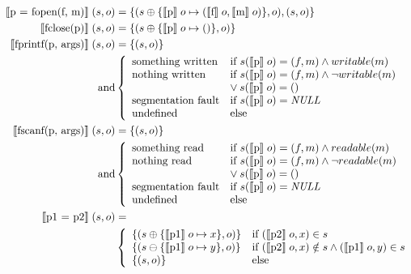 \begin{align*}
\llbracket \text{p = fopen(f, m)} \rrbracket \; (s,o) &= \{ (s \oplus \{ \llbracket \text{p} \rrbracket \; o \mapsto (\llbracket \text{f} \rrbracket \; o, \llbracket \text{m} \rrbracket \; o) \}, o), (s,o) \}\\
\llbracket \text{fclose(p)} \rrbracket \; (s,o) &= \{(s \oplus \{ \llbracket \text{p} \rrbracket \; o \mapsto () \}, o)\}\\
\llbracket \text{fprintf(p, args)} \rrbracket \; (s,o) &= \{(s,o)\}\\
	\text{ and}&
	\left\{\begin{array}{ll}
	\text{something written} & \text{if } s(\llbracket \text{p} \rrbracket \; o) = (f,m) \wedge writable(m)\\
	\text{nothing written} & \text{if } s(\llbracket \text{p} \rrbracket \; o) = (f,m) \wedge \neg writable(m)\\
	& \vee \: s(\llbracket \text{p} \rrbracket \; o) = ()\\
	\text{segmentation fault} & \text{if } s(\llbracket \text{p} \rrbracket \; o) = \mathit{NULL}\\
	\text{undefined} & \text{else}
	\end{array}\right.\\
\llbracket \text{fscanf(p, args)} \rrbracket \; (s,o) &= \{(s,o)\}\\
	\text{ and}&
	\left\{\begin{array}{ll}
	\text{something read} & \text{if } s(\llbracket \text{p} \rrbracket \; o) = (f,m) \wedge readable(m)\\
	\text{nothing read} & \text{if } s(\llbracket \text{p} \rrbracket \; o) = (f,m) \wedge \neg readable(m)\\
	& \vee \: s(\llbracket \text{p} \rrbracket \; o) = ()\\
	\text{segmentation fault} & \text{if } s(\llbracket \text{p} \rrbracket \; o) = \mathit{NULL}\\
	\text{undefined} & \text{else}
	\end{array}\right.\\
\llbracket \text{p1 = p2} \rrbracket \; (s,o) &=\\ &\left\{\begin{array}{ll}
	\{(s \oplus \{ \llbracket \text{p1} \rrbracket \; o \mapsto x \}, o)\} & \text{if } (\llbracket \text{p2} \rrbracket \; o, x) \in s\\
	\{(s \ominus \{ \llbracket \text{p1} \rrbracket \; o \mapsto y \}, o)\} & \text{if } (\llbracket \text{p2} \rrbracket \; o, x) \notin s \wedge (\llbracket \text{p1} \rrbracket \; o, y) \in s\\
	\{(s,o)\} & \text{else}
	\end{array}\right.
\end{align*}

